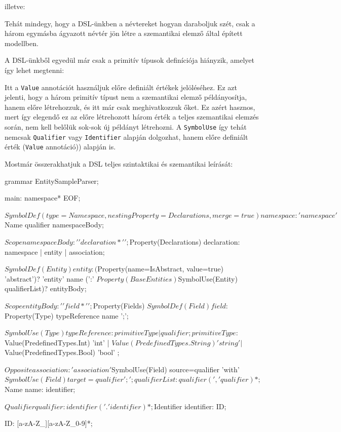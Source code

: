 \documentclass[12pt, a4paper]{report}
\newcommand{\f}[1]{\texttt{#1}}
\begin{document}
illetve:


Tehát mindegy, hogy a DSL-ünkben a névtereket hogyan daraboljuk szét, csak a három egymásba ágyazott névtér jön létre a szemantikai elemző által épített modellben.

A DSL-ünkből egyedül már csak a primitív típusok definíciója hiányzik, amelyet így lehet megtenni:


Itt a \f{Value} annotációt használjuk előre definiált értékek jelöléséhez. Ez azt jelenti, hogy a három primitív típust nem a szemantikai elemző példányosítja, hanem előre létrehozzuk, és itt már csak meghivatkozzuk őket. Ez azért hasznos, mert így elegendő ez az előre létrehozott három érték a teljes szemantikai elemzés során, nem kell belőlük sok-sok új példányt létrehozni. A \f{SymbolUse} így tehát nemcsak \f{Qualifier} vagy \f{Identifier} alapján dolgozhat, hanem előre definiált érték (\f{Value} annotáció)) alapján is.

Mostmár összerakhatjuk a DSL teljes szintaktikai és szemantikai leírását:

\begin{antlr4code}
grammar EntitySampleParser;

main: namespace* EOF;

$SymbolDef(type=Namespace,nestingProperty=Declarations,merge=true)
namespace: 'namespace' $Name qualifier namespaceBody;

$Scope
namespaceBody: '{' declaration* '}';

$Property(Declarations)
declaration: namespace | entity | association;

$SymbolDef(Entity)
entity: ($Property(name=IsAbstract, value=true) 'abstract')? 'entity' name (':' $Property(BaseEntities) $SymbolUse(Entity) qualifierList)? entityBody;

$Scope
entityBody: '{' field* '}';

$Property(Fields)
$SymbolDef(Field)
field: $Property(Type) typeReference name ';';

$SymbolUse(Type)
typeReference: primitiveType | qualifier;

primitiveType
	: $Value(PredefinedTypes.Int) 'int'
	| $Value(PredefinedTypes.String) 'string'
	| $Value(PredefinedTypes.Bool) 'bool'
	;

$Opposite
association: 'association' $SymbolUse(Field) source=qualifier 'with' $SymbolUse(Field) target=qualifier ';';

qualifierList: qualifier (',' qualifier)*;

$Name
name: identifier;

$Qualifier
qualifier: identifier ('.' identifier)*;

$Identifier
identifier: ID;

ID: [a-zA-Z_][a-zA-Z_0-9]*;
\end{antlr4code}
\end{document}
